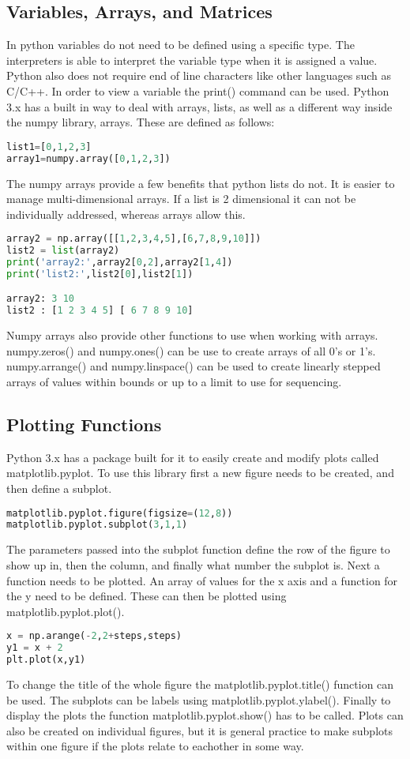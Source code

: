 \documentclass{article}
\begin{document}
\subsection{Variables, Arrays, and Matrices}
In python variables do not need to be defined using a specific type. The interpreters is able to interpret the variable type when it is assigned a value. Python also does not require end of line characters like other languages such as C/C++. In order to view a variable the print() command can be used. Python 3.x has a built in way to deal with arrays, lists, as well as a different way inside the numpy library, arrays. These are defined as follows:
\begin{lstlisting}[language=Python]
list1=[0,1,2,3]
array1=numpy.array([0,1,2,3])
\end{lstlisting}
The numpy arrays provide a few benefits that python lists do not. It is easier to manage multi-dimensional arrays. If a list is 2 dimensional it can not be individually addressed, whereas arrays allow this.
\begin{lstlisting}[language=Python]
array2 = np.array([[1,2,3,4,5],[6,7,8,9,10]])
list2 = list(array2)
print('array2:',array2[0,2],array2[1,4])
print('list2:',list2[0],list2[1])

array2: 3 10
list2 : [1 2 3 4 5] [ 6 7 8 9 10]
\end{lstlisting}
Numpy arrays also provide other functions to use when working with arrays. numpy.zeros() and numpy.ones() can be use to create arrays of all 0's or 1's. numpy.arrange() and numpy.linspace() can be used to create linearly stepped arrays of values within bounds or up to a limit to use for sequencing.
\subsection{Plotting Functions}
Python 3.x has a package built for it to easily create and modify plots called matplotlib.pyplot. To use this library first a new figure needs to be created, and then define a subplot.
\begin{lstlisting}[language=Python]
matplotlib.pyplot.figure(figsize=(12,8))
matplotlib.pyplot.subplot(3,1,1)
\end{lstlisting}
The parameters passed into the subplot function define the row of the figure to show up in, then the column, and finally what number the subplot is. Next a function needs to be plotted. An array of values for the x axis and a function for the y need to be defined. These can then be plotted using matplotlib.pyplot.plot().
\begin{lstlisting}[language=Python]
x = np.arange(-2,2+steps,steps)
y1 = x + 2
plt.plot(x,y1)
\end{lstlisting}
To change the title of the whole figure the matplotlib.pyplot.title() function can be used. The subplots can be labels using matplotlib.pyplot.ylabel(). Finally to display the plots the function matplotlib.pyplot.show() has to be called. Plots can also be created on individual figures, but it is general practice to make subplots within one figure if the plots relate to eachother in some way.
\end{document}
